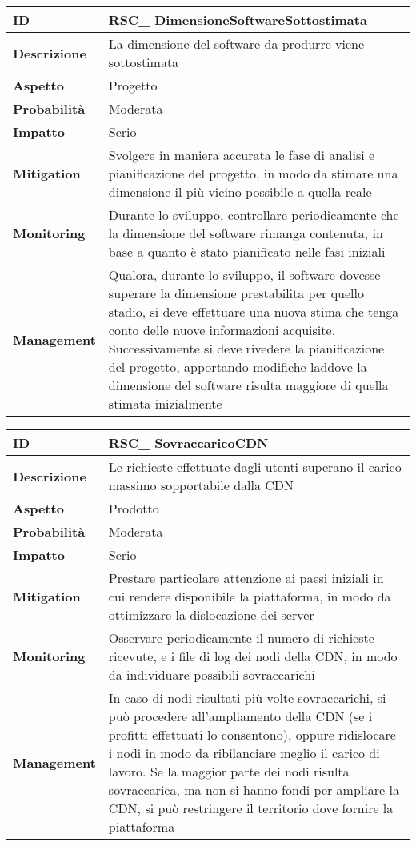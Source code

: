 \begin{tabular}{|p{2.2cm}|p{9.6cm}| }
	\hline
   \textbf{ID} & RSC\_ DimensioneSoftwareSottostimata\\ [0.5ex] 
   \hline
   \textbf{Descrizione} & La dimensione del software da produrre viene sottostimata \\ 
   \hline
   \textbf{Aspetto} &  Progetto \\
   \hline
   \textbf{Probabilità} & Moderata\\ 
   \hline
   \textbf{Impatto} & Serio\\
   \hline
   \textbf{Mitigation} & Svolgere in maniera accurata le fase di analisi e pianificazione del progetto, in modo da stimare una dimensione il più vicino possibile a quella reale \\ 
   \hline
   \textbf{Monitoring} & Durante lo sviluppo, controllare periodicamente che la dimensione del software rimanga contenuta, in base a quanto è stato pianificato nelle fasi iniziali\\ 
   \hline
   \textbf{Management} & Qualora, durante lo sviluppo, il software dovesse superare la dimensione prestabilita per quello stadio, si deve effettuare una nuova stima che tenga conto delle nuove informazioni acquisite. Successivamente si deve rivedere la pianificazione del progetto, apportando modifiche laddove la dimensione del software risulta maggiore di quella stimata inizialmente \\ 
   \hline
\end{tabular}

\begin{tabular}{|p{2.2cm}|p{9.6cm}| } 
 	\hline
	 \textbf{ID} & RSC\_ SovraccaricoCDN\\ [0.5ex] 
	\hline
	\textbf{Descrizione} & Le richieste effettuate dagli utenti superano il carico massimo sopportabile dalla CDN \\ 
	\hline
   	\textbf{Aspetto} &  Prodotto \\
	\hline
	\textbf{Probabilità} &  Moderata \\ 
	\hline
	\textbf{Impatto} &  Serio \\ 
	\hline
	\textbf{Mitigation} & Prestare particolare attenzione ai paesi iniziali in cui rendere disponibile la piattaforma, in modo da ottimizzare la dislocazione dei server \\ 
	\hline
	\textbf{Monitoring} & Osservare periodicamente il numero di richieste ricevute, e i file di log dei nodi della CDN, in modo da individuare possibili sovraccarichi\\ 
	\hline
	\textbf{Management} & In caso di nodi risultati più volte sovraccarichi, si può procedere all'ampliamento della CDN (se i profitti effettuati lo consentono), oppure ridislocare i nodi in modo da ribilanciare meglio il carico di lavoro. Se la maggior parte dei nodi risulta sovraccarica, ma non si hanno fondi per ampliare la CDN, si può restringere il territorio dove fornire la piattaforma\\ 
	\hline
\end{tabular}


